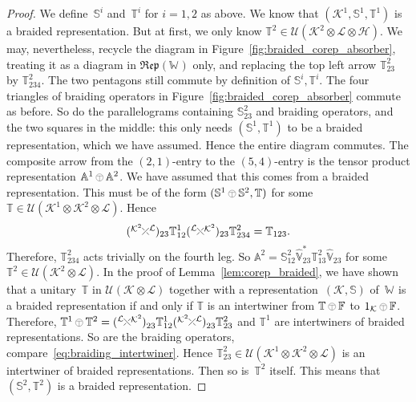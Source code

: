 \documentclass[a4paper]{amsart}
\numberwithin{equation}{section}
\theoremstyle{plain}
\numberwithin{theorem}{section}
\theoremstyle{definition}
\theoremstyle{remark}
\newcommand{\tenscorep}{\mathbin{\begin{tikzpicture}[baseline,x=.75ex,y=.75ex] \draw[line width=.2pt] (-0.8,1.15)--(0.8,1.15);\draw[line width=.2pt](0,-0.25)--(0,1.15); \draw[line width=.2pt] (0,0.75) circle [radius = 1];\end{tikzpicture}}}
\newcommand*{\Braiding}[2]{\begin{tikzpicture}[baseline]
    \draw[-] (0,0) -- (1.4ex,1.4ex) node[right,inner sep=0pt] {$\scriptstyle #2$};
    \draw[-,draw=white,line width=2.4pt] (0,1.4ex) -- (1.4ex,0);
    \draw[-] (1.4ex,0) -- (0,1.4ex) node[left,inner sep=0pt] {$\scriptstyle #1$};
  \end{tikzpicture}}
\newcommand*{\Dualbraiding}[2]{\begin{tikzpicture}[baseline]
    \draw[-] (1.4ex,0) -- (0,1.4ex) node[left,inner sep=0pt] {$\scriptstyle #1$};
    \draw[-,draw=white,line width=2.4pt] (0,0) -- (1.4ex,1.4ex);
    \draw[-] (0,0) -- (1.4ex,1.4ex) node[right,inner sep=0pt] {$\scriptstyle #2$};
  \end{tikzpicture}}
\newcommand*{\Corep}[1]{\mathbb{#1}}          %
\newcommand*{\DuCorep}[1]{\hat{\Corep{#1}}}   %
\newcommand*{\Corepcat}[1]{\mathfrak{Rep}(#1)}%
\newcommand*{\Multunit}[1][]{\mathbb W^{#1}}%
\newcommand*{\BrMultunit}{\mathbb F}%
\newcommand*{\Hils}[1][H]{\mathcal{#1}}%
\newcommand*{\U}{\mathcal U}%
\begin{document}
\begin{proof}
  We define~\(\Corep{S}^i\)
  and~\(\Corep{T}^i\)
  for \(i=1,2\)
  as above.  We know that \((\Hils[K]^1,\Corep{S}^1,\Corep{T}^1)\)
  is a braided representation.  But at first, we only know
  \(\Corep{T}^2 \in \U(\Hils[K]^2\otimes \Hils[L]\otimes\Hils)\).
  We may, nevertheless, recycle the diagram in
  Figure~\ref{fig:braided_corep_absorber}, treating it as a diagram in
  \(\Corepcat{\Multunit}\)
  only, and replacing the top left arrow \(\Corep{T}^2_{23}\)
  by \(\Corep{T}^2_{234}\).
  The two pentagons still commute by definition of
  \(\Corep{S}^i,\Corep{T}^i\).
  The four triangles of braiding operators in
  Figure~\ref{fig:braided_corep_absorber} commute as before.  So do
  the parallelograms containing \(\Corep{S}^2_{23}\)
  and braiding operators, and the two squares in the middle: this only
  needs \((\Corep{S}^1,\Corep{T}^1)\)
  to be a braided representation, which we have assumed.  Hence the
  entire diagram commutes.  The composite arrow from the
  \((2,1)\)-entry
  to the \((5,4)\)-entry
  is the tensor product representation
  \(\Corep{A}^1 \tenscorep \Corep{A}^2\).
  We have assumed that this comes from a braided representation.  This
  must be of the form
  \((\Corep{S}^1\tenscorep \Corep{S}^2,\Corep{T})\)
  for some
  \(\Corep{T}\in \U(\Hils[K]^1\otimes\Hils[K]^2\otimes\Hils[L])\).
  Hence
  \[
  (\Dualbraiding{\Hils[K]^2}{\Hils[L]})_{23}
  \Corep{T}^1_{12}
  (\Braiding{\Hils[L]}{\Hils[K]^2})_{23}
  \Corep{T}^2_{234}
  = \Corep{T}_{123}.
  \]
  Therefore, \(\Corep{T}^2_{234}\)
  acts trivially on the fourth leg.  So
  \(\Corep{A}^2 = \Corep{S}^2_{12} \DuCorep{V}_{23}^* \Corep{T}^2_{13}
  \DuCorep{V}_{23}\)
  for some \(\Corep{T}^2\in\U(\Hils[K]^2\otimes\Hils[L])\).
  In the proof of Lemma~\ref{lem:corep_braided}, we have shown that a
  unitary~\(\Corep{T}\)
  in \(\U(\Hils[K]\otimes\Hils[L])\)
  together with a representation~\((\Hils[K],\Corep{S})\)
  of~\(\Multunit\)
  is a braided representation if and only if \(\Corep{T}\)
  is an intertwiner from \(\Corep{T}\tenscorep \BrMultunit\)
  to \(1_{\Hils[K]}\tenscorep \BrMultunit\).
  Therefore,
  \(\Corep{T}^1\tenscorep \Corep{T}^2=
  (\Braiding{\Hils[L]}{\Hils[K]^2})^{\phantom1}_{23} \Corep{T}^1_{12}
  (\Dualbraiding{\Hils[K]^2}{\Hils[L]})^{\phantom1}_{23}
  \Corep{T}^2_{23}\)
  and \(\Corep{T}^1\)
  are intertwiners of braided representations.  So are the braiding
  operators, compare~\eqref{eq:braiding_intertwiner}.  Hence
  \(\Corep{T}^2_{23}\in\U(\Hils[K]^1\otimes\Hils[K]^2\otimes\Hils[L])\)
  is an intertwiner of braided representations.  Then so
  is~\(\Corep{T}^2\)
  itself.  This means that~\((\Corep{S}^2,\Corep{T}^2)\)
  is a braided representation.
\end{proof}
\end{document}
